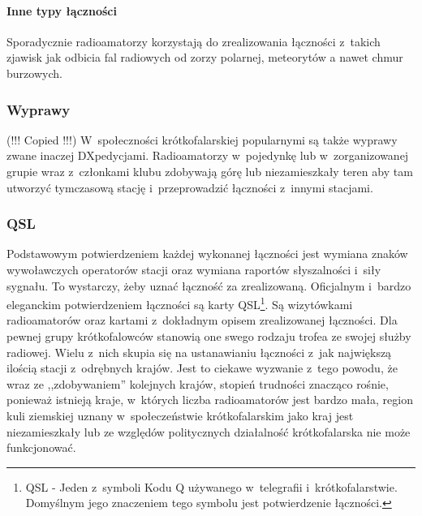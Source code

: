 \documentclass[]{mgr}
\begin{document}
                    \paragraph{Inne typy łączności}
                    Sporadycznie radioamatorzy korzystają do zrealizowania łączności z~takich zjawisk jak odbicia fal radiowych od zorzy polarnej, meteorytów a nawet chmur burzowych.

                \subsubsection{Wyprawy}
                (!!! Copied !!!) W~społeczności krótkofalarskiej popularnymi są także wyprawy zwane inaczej DXpedycjami. Radioamatorzy w~pojedynkę lub w~zorganizowanej grupie wraz z~członkami klubu zdobywają górę lub niezamieszkały teren aby tam utworzyć tymczasową stację i~przeprowadzić łączności z~innymi stacjami.

                \subsubsection{QSL}
                Podstawowym potwierdzeniem każdej wykonanej łączności jest wymiana znaków wywoławczych operatorów stacji oraz wymiana raportów słyszalności i~siły sygnału. To wystarczy, żeby uznać łączność za zrealizowaną. Oficjalnym i~bardzo eleganckim potwierdzeniem łączności są karty QSL\footnote{QSL - Jeden z~symboli Kodu Q używanego w~telegrafii i~krótkofalarstwie. Domyślnym jego znaczeniem tego symbolu jest potwierdzenie łączności.}. Są wizytówkami radioamatorów oraz kartami z~dokładnym opisem zrealizowanej łączności. Dla pewnej grupy krótkofalowców stanowią one swego rodzaju trofea ze swojej służby radiowej. Wielu z~nich skupia się na ustanawianiu łączności z~jak największą ilością stacji z~odrębnych krajów. Jest to ciekawe wyzwanie z~tego powodu, że wraz ze ,,zdobywaniem'' kolejnych krajów, stopień trudności znacząco rośnie, ponieważ istnieją kraje, w~których liczba radioamatorów jest bardzo mała, region kuli ziemskiej uznany w~społeczeństwie krótkofalarskim jako kraj jest niezamieszkały lub ze względów politycznych działalność krótkofalarska nie może funkcjonować.

    \nocite{*}
\end{document}

